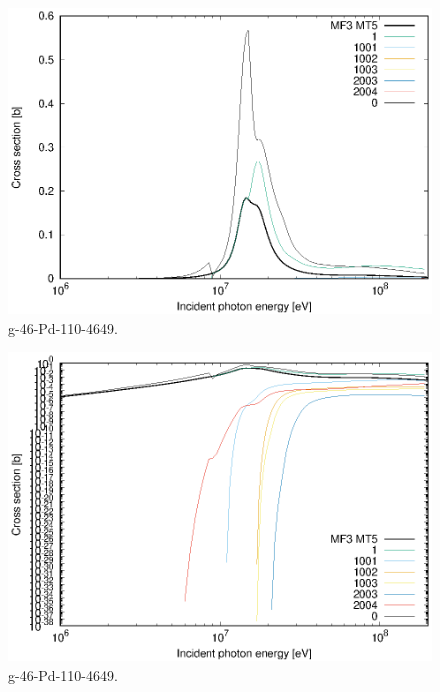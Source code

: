 \begin{figure}
 \includegraphics[width=\linewidth]{eps/g_46-Pd-110_4649.eps}
  \caption{g-46-Pd-110-4649.}
\end{figure}
\begin{figure}
 \includegraphics[width=\linewidth]{eps-log/g_46-Pd-110_4649.eps}
 \caption{g-46-Pd-110-4649.}
\end{figure}
\newpage \clearpage

